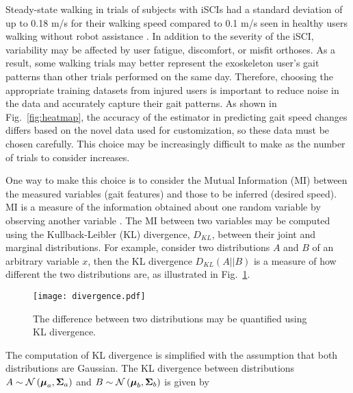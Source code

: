 Steady-state walking in trials of subjects with iSCIs had a standard deviation of up to 0.18 m/s for their walking speed compared to 0.1 m/s seen in healthy users walking without robot assistance \cite{socie2013gait}. In addition to the severity of the iSCI, variability may be affected by user fatigue, discomfort, or misfit orthoses. As a result, some walking trials may better represent the exoskeleton user's gait patterns than other trials performed on the same day. Therefore, choosing the appropriate training datasets from injured users is important to reduce noise in the data and accurately capture their gait patterns. As shown in Fig.~\ref{fig:heatmap}, the accuracy of the estimator in predicting gait speed changes differs based on the novel data used for customization, so these data must be chosen carefully. This choice may be increasingly difficult to make as the number of trials to consider increases. 

One way to make this choice is to consider the Mutual Information (MI) between the measured variables (gait features) and those to be inferred (desired speed). MI is a measure of the information obtained about one random variable by observing another variable \cite{cover1999elements}. The MI between two variables may be computed using the Kullback-Leibler (KL) divergence, $ D_{KL} $, between their joint and marginal distributions. For example, consider two distributions $ A $ and $ B $ of an arbitrary variable $ x $, then the KL divergence $ D_{KL}(A||B) $ is a measure of how different the two distributions are, as illustrated in Fig.~\ref{fig:divergence}. 
%
\begin{figure}
	\centering
	\texttt{[image: divergence.pdf]}
	\caption{The difference between two distributions may be quantified using KL divergence.}\label{fig:divergence}
\end{figure}

The computation of KL divergence is simplified with the assumption that both distributions are Gaussian. The KL divergence between distributions $ A \sim \mathcal{N}\left(\boldsymbol{\mu}_a, \boldsymbol{\Sigma}_a\right) $ and $ B \sim \mathcal{N}\left(\boldsymbol{\mu}_b, \boldsymbol{\Sigma}_b\right) $ is given by

